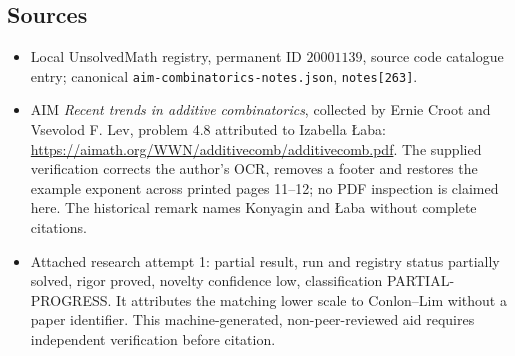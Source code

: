 \documentclass[11pt]{article}
\begin{document}
\subsection{Sources}
\begin{itemize}
\item Local UnsolvedMath registry, permanent ID $20001139$, source code catalogue entry; canonical \texttt{aim-combinatorics-notes.json}, \texttt{notes[263]}.
\item AIM \emph{Recent trends in additive combinatorics}, collected by Ernie Croot and Vsevolod F. Lev, problem 4.8 attributed to Izabella \L aba: \url{https://aimath.org/WWN/additivecomb/additivecomb.pdf}. The supplied verification corrects the author's OCR, removes a footer and restores the example exponent across printed pages 11--12; no PDF inspection is claimed here. The historical remark names Konyagin and \L aba without complete citations.
\item Attached research attempt 1: partial result, run and registry status partially solved, rigor proved, novelty confidence low, classification PARTIAL-PROGRESS. It attributes the matching lower scale to Conlon--Lim without a paper identifier. This machine-generated, non-peer-reviewed aid requires independent verification before citation.
\end{itemize}
\end{document}
